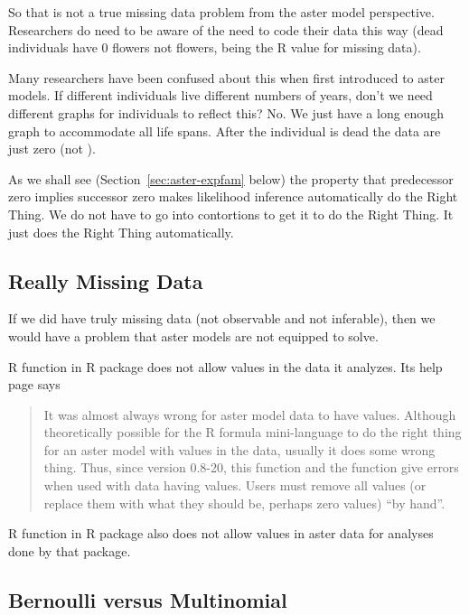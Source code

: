 So that is not a true missing data problem from the aster model perspective.
Researchers do need to be aware of the need to code their data this way
(dead individuals have 0 flowers not  flowers,  being
the R value for missing data).

Many researchers have been confused about this when first introduced to
aster models.  If different individuals live different numbers of years,
don't we need different graphs for individuals to reflect this?  No.
We just have a long enough graph to accommodate all life spans.  After
the individual is dead the data are just zero (not ).

As we shall see (Section~\ref{sec:aster-expfam} below)
the property that predecessor zero implies successor zero
makes likelihood inference automatically do the Right Thing.
We do not have to go into contortions to get it to do the Right Thing.
It just does the Right Thing automatically.

\subsection{Really Missing Data}
\label{sec:miss-too}

If we did have truly missing data (not observable and not inferable),
then we would have a problem that aster models are not equipped to solve.

R function  in R package  does not allow 
values in the data it analyzes.  Its help page says
\begin{quotation}
     It was almost always wrong for aster model data to have 
     values. Although theoretically possible for the R formula
     mini-language to do the right thing for an aster model with 
     values in the data, usually it does some wrong thing.  Thus, since
     version 0.8-20, this function and the  function give
     errors when used with data having  values.  Users must remove
     all  values (or replace them with what they should be, perhaps
     zero values) ``by hand''.
\end{quotation}
R function  in R package  also does not
allow  values in aster data for analyses done by that package.

\subsection{Bernoulli versus Multinomial}

